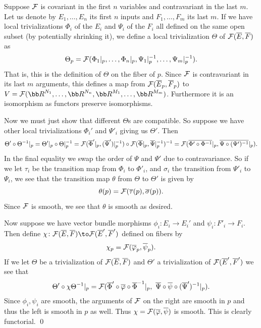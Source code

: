 \ethrm

\bproof

    Suppose ${{\cal F}}$ is covariant in the first $n$ variables and contravariant in the last $m$.
    Let us denote by $E_1,\dots,E_n$ its first $n$ inputs and $F_1,\dots,F_m$ its last $m$.
    If we have local trivializations $\Phi_i$ of the $E_i$ and $\Psi_i$ of the $F_i$ all defined on the same open subset (by potentially shrinking it), we define
    a local trivialization $\Theta$ of ${{\cal F}}(\overline E,\overline F)$ as
    $$ \Theta_p = {{\cal F}}(\Phi_1|_p,\dots,\Phi_n|_p,\Psi_1|_p^{-1},\dots,\Psi_m|_p^{-1}) . $$
    That is, this is the definition of $\Theta$ on the fiber of $p$.
    Since ${{\cal F}}$ is contravariant in its last $m$ arguments, this defines a map from ${{\cal F}}(\overline E_p,\overline F_p)$ to $V=\F(\bR^{N_1},\dots,\bR^{N_n},\bR^{M_1},\dots,\bR^{M_m})$.
    Furthermore it is an isomorphism as functors preserve isomorphisms.

    Now we must just show that different $\Theta$s are compatible.
    So suppose we have other local trivializations $\Phi_i'$ and $\Psi'_i$ giving us $\Theta'$.
    Then
    $$ \Theta'\circ\Theta^{-1}|_p = \Theta'|_p\circ\Theta|_p^{-1} = {{\cal F}}(\overline\Phi'|_p,(\overline\Psi')|_p^{-1})\circ{{\cal F}}(\overline\Phi|_p,\overline\Psi|_p^{-1})^{-1}
    = {{\cal F}}(\overline{\Phi'\circ\Phi^{-1}}|_p,\overline{\Psi\circ(\Psi')^{-1}}|_p) . $$
    In the final equality we swap the order of $\Psi$ and $\Psi'$ due to contravariance.
    So if we let $\tau_i$ be the transition map from $\Phi_i$ to $\Phi'_i$, and $\sigma_i$ the transition from $\Psi'_i$ to $\Psi_i$, we see that the transition map
    $\theta$ from $\Theta$ to $\Theta'$ is given by
    $$ \theta(p) = {{\cal F}}(\overline\tau(p),\overline\sigma(p)) . $$
    Since ${{\cal F}}$ is smooth, we see that $\theta$ is smooth as desired.

    Now suppose we have vector bundle morphisms $\phi_i\colon E_i\to E_i'$ and $\psi_i\colon F'_i\to F_i$.
    Then define $\chi\colon\F(\bar E,\bar F)\to\F(\bar E',\bar F')$ defined on fibers by
    $$ \chi_p = {{\cal F}}(\overline{\varphi}_p,\overline\psi_p) . $$
    If we let $\Theta$ be a trivialization of ${{\cal F}}(\overline E,\overline F)$ and $\Theta'$ a trivialization of ${{\cal F}}(\overline E',\overline F')$ we see that
    $$ \Theta'\circ\chi\Theta^{-1}|_p = \F(\bar\Phi'\circ\bar\phi\circ\bar\Phi^{-1}|_p,\ \bar\Psi\circ\bar\psi\circ(\bar\Psi')^{-1}|_p) . $$
    Since $\phi_i,\psi_i$ are smooth, the arguments of ${{\cal F}}$ on the right are smooth in $p$ and thus the left is smooth in $p$ as well.
    Thus $\chi={{\cal F}}(\overline{\varphi},\overline\psi)$ is smooth.
    This is clearly functorial.
    \qed

\eproof

